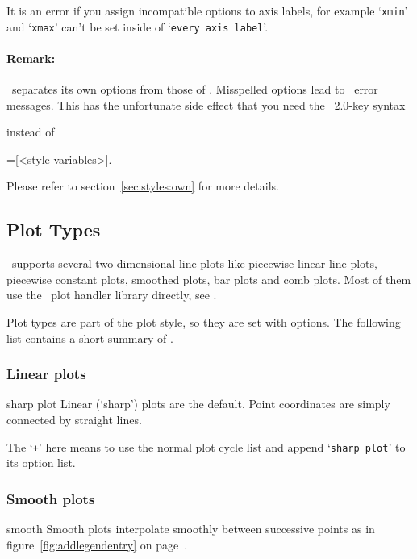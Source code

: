 It is an error if you assign incompatible options to axis labels, for example `\texttt{xmin}' and `\texttt{xmax}' can't be set inside of `\texttt{every axis label}'.

\paragraph{Remark:} \PGFPlots\ separates its own options from those of \Tikz. Misspelled options lead to \Tikz\ error messages. This has the unfortunate side effect that you need the \PGF\ 2.0-key syntax
\begin{codeexample}
\end{codeexample}
instead of
\begin{codeexample}
=[<style variables>].
\end{codeexample}
Please refer to section~\ref{sec:styles:own} for more details.



\subsection{Plot Types}
\PGFPlots\ supports several two-dimensional line-plots like piecewise linear line plots, piecewise constant plots, smoothed plots, bar plots and comb plots. Most of them use the \PGF\ plot handler library directly, see \cite[section 18.8]{tikz}.

Plot types are part of the plot style, so they are set with options. The following list contains a short summary of \cite[section 18.8]{tikz}.


\subsubsection{Linear plots}
\begin{plottype}{sharp plot}
Linear (`sharp') plots are the default. Point coordinates are simply connected by straight lines. 

The `\texttt{+}' here means to use the normal plot cycle list and append `\texttt{sharp plot}' to its option list.
\end{plottype}

\subsubsection{Smooth plots}
\begin{plottype}{smooth}
Smooth plots interpolate smoothly between successive points as in figure~\ref{fig:addlegendentry} on page~\pageref{fig:addlegendentry}.
\end{plottype}

